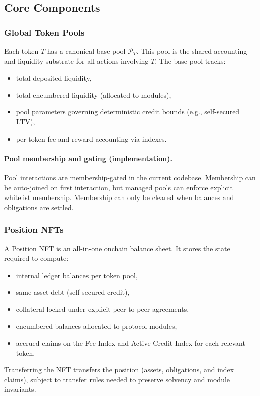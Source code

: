 \documentclass[version=preprint]{iacrcc}
\begin{document}
\subsection{Core Components}

\subsubsection{Global Token Pools}

Each token $T$ has a canonical base pool $\mathcal{P}_T$. This pool is the shared accounting and liquidity substrate for all actions involving $T$. The base pool tracks:
\begin{itemize}
  \item total deposited liquidity,
  \item total encumbered liquidity (allocated to modules),
  \item pool parameters governing deterministic credit bounds (e.g., self-secured LTV),
  \item per-token fee and reward accounting via indexes.
\end{itemize}

\paragraph{Pool membership and gating (implementation).}
Pool interactions are membership-gated in the current codebase. Membership can be auto-joined on first interaction, but managed pools can enforce explicit whitelist membership. Membership can only be cleared when balances and obligations are settled.

\subsubsection{Position NFTs}

A Position NFT is an all-in-one onchain balance sheet. It stores the state required to compute:
\begin{itemize}
  \item internal ledger balances per token pool,
  \item same-asset debt (self-secured credit),
  \item collateral locked under explicit peer-to-peer agreements,
  \item encumbered balances allocated to protocol modules,
  \item accrued claims on the Fee Index and Active Credit Index for each relevant token.
\end{itemize}
Transferring the NFT transfers the position (assets, obligations, and index claims), subject to transfer rules needed to preserve solvency and module invariants.
\end{document}
